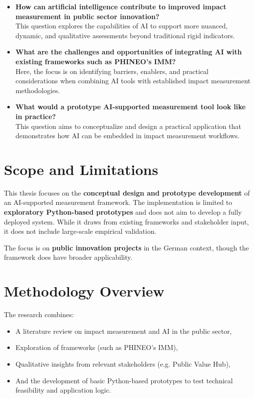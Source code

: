 \begin{itemize}
  \item \textbf{How can artificial intelligence contribute to improved impact measurement in public sector innovation?} \\
  This question explores the capabilities of AI to support more nuanced, dynamic, and qualitative assessments beyond traditional rigid indicators.

  \item \textbf{What are the challenges and opportunities of integrating AI with existing frameworks such as PHINEO’s IMM?} \\
  Here, the focus is on identifying barriers, enablers, and practical considerations when combining AI tools with established impact measurement methodologies.

  \item \textbf{What would a prototype AI-supported measurement tool look like in practice?} \\
  This question aims to conceptualize and design a practical application that demonstrates how AI can be embedded in impact measurement workflows.
\end{itemize}

\section{Scope and Limitations}\label{sec:scope-and-limitations}

This thesis focuses on the \textbf{conceptual design and prototype development} of an AI-supported measurement framework. The implementation is limited to \textbf{exploratory Python-based prototypes} and does not aim to develop a fully deployed system. While it draws from existing frameworks and stakeholder input, it does not include large-scale empirical validation.

The focus is on \textbf{public innovation projects} in the German context, though the framework does have broader applicability.


\section{Methodology Overview}\label{sec:methodology-overview}

The research combines:
\begin{itemize}
\item
A literature review on impact measurement and AI in the public sector,
\item
Exploration of frameworks (such as PHINEO’s IMM),
\item
Qualitative insights from relevant stakeholders (e.g. Public Value Hub),
\item
And the development of basic Python-based prototypes to test technical feasibility and application logic.
\end{itemize}

